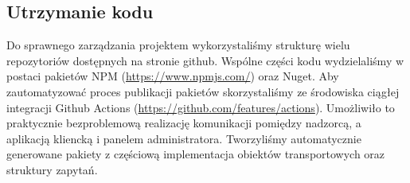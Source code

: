 \documentclass[../opis-rozwiazania.tex]{subfiles}
\begin{document}
\subsection{Utrzymanie kodu}
Do sprawnego zarządzania projektem wykorzystaliśmy strukturę wielu repozytoriów dostępnych na stronie github.
Wspólne części kodu wydzielaliśmy w postaci pakietów NPM (\url{https://www.npmjs.com/}) oraz Nuget.
Aby zautomatyzować proces publikacji pakietów skorzystaliśmy ze środowiska ciągłej integracji Github Actions (\url{https://github.com/features/actions}).
Umożliwiło to praktycznie bezproblemową realizację komunikacji pomiędzy nadzorcą, a aplikacją kliencką i panelem administratora.
Tworzyliśmy automatycznie generowane pakiety z częściową implementacja obiektów transportowych oraz struktury zapytań.
\end{document}
